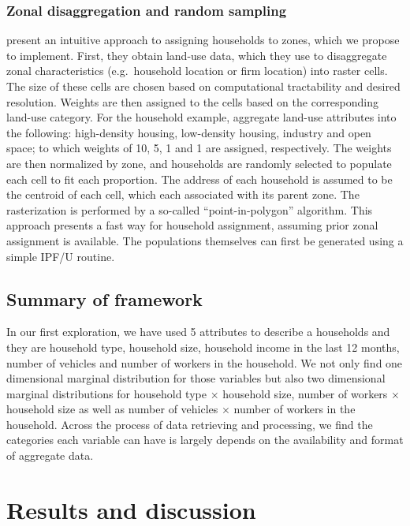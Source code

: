 \documentclass[11pt,twoside]{article}
\numberwithin{equation}{section}
\newcommand{\?}{\stackrel{?}{=}}
\begin{document}
\subsubsection{Zonal disaggregation and random sampling}
\textcite{moekel2003microsimulation} present an intuitive approach to assigning households to zones, which we propose to implement.
First, they obtain land-use data, which they use to disaggregate zonal characteristics (e.g.\ household location or firm location) into raster cells.
The size of these cells are chosen based on computational tractability and desired resolution.
Weights are then assigned to the cells based on the corresponding land-use category.
For the household example, \textcite{moekel2003microsimulation} aggregate land-use attributes into the following: high-density housing, low-density housing, industry and open space;
to which weights of 10, 5, 1 and 1 are assigned, respectively.
The weights are then normalized by zone, and households are randomly selected to populate each cell to fit each proportion.
The address of each household is assumed to be the centroid of each cell, which each associated with its parent zone.
The rasterization is performed by a so-called ``point-in-polygon'' algorithm.
This approach presents a fast way for household assignment, assuming prior zonal assignment is available.
The populations themselves can first be generated using a simple IPF/U routine.


\subsection{Summary of framework}
In our first exploration, we have used 5 attributes to describe a households and they are household type, household size, household income in the last 12 months, number of vehicles and number of workers in the household. We not only find one dimensional marginal distribution for those variables but also two dimensional marginal distributions for household type $\times$ household size, number of workers $\times$ household size as well as number of vehicles $\times$ number of workers in the household. Across the process of data retrieving and processing, we find the categories each variable can have is largely depends on the availability and format of aggregate data.




\section{Results and discussion}
\end{document}
